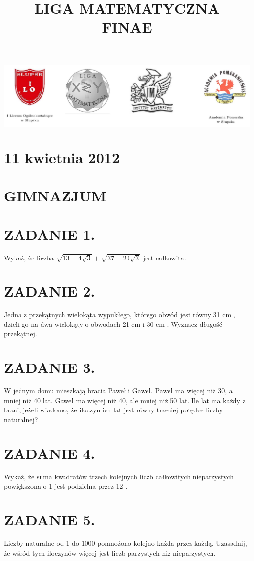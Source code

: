 \documentclass[10pt]{article}
\title{LIGA MATEMATYCZNA \\
 FINAE }
\author{}
\date{}
\begin{document}
\maketitle
\begin{center}
\includegraphics[max width=\textwidth]{2024_11_21_60bf8f617f4dd1bf277eg-1}
\end{center}

\section*{11 kwietnia 2012}
\section*{GIMNAZJUM}
\section*{ZADANIE 1.}
Wykaż, że liczba \(\sqrt{13-4 \sqrt{3}}+\sqrt{37-20 \sqrt{3}}\) jest całkowita.

\section*{ZADANIE 2.}
Jedna z przekątnych wielokąta wypukłego, którego obwód jest równy 31 cm , dzieli go na dwa wielokąty o obwodach 21 cm i 30 cm . Wyznacz długość przekątnej.

\section*{ZADANIE 3.}
W jednym domu mieszkają bracia Paweł i Gaweł. Paweł ma więcej niż 30, a mniej niż 40 lat. Gaweł ma więcej niż 40, ale mniej niż 50 lat. Ile lat ma każdy z braci, jeżeli wiadomo, że iloczyn ich lat jest równy trzeciej potędze liczby naturalnej?

\section*{ZADANIE 4.}
Wykaż, że suma kwadratów trzech kolejnych liczb całkowitych nieparzystych powiększona o 1 jest podzielna przez 12 .

\section*{ZADANIE 5.}
Liczby naturalne od 1 do 1000 pomnożono kolejno każda przez każdą. Uzasadnij, że wśród tych iloczynów więcej jest liczb parzystych niż nieparzystych.
\end{document}
